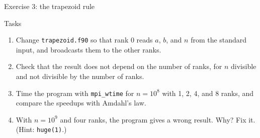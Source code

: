 \begin{frame}{Exercise 3: the trapezoid rule}
  \begin{block}{Tasks}
    \begin{enumerate}
      \item Change \texttt{trapezoid.f90} so that rank 0 reads $a$, $b$, and $n$ from the standard input, and broadcasts them to the other ranks.
      \item Check that the result does not depend on the number of ranks, for $n$ divisible and not divisible by the number of ranks.
      \item Time the program with \texttt{mpi\_wtime} for $n = 10^8$ with 1, 2, 4, and 8 ranks, and compare the speedups with Amdahl's law.
      \item With $n = 10^9$ and four ranks, the program gives a wrong result. Why? Fix it. (Hint: \texttt{huge(1)}.)
    \end{enumerate}
  \end{block}
\end{frame}


